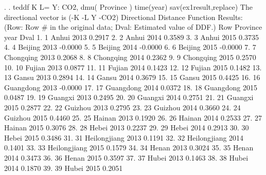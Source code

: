 . 
. teddf K L= Y: CO2, dmu( Province ) time(year) sav(ex1result,replace)
{\smallskip}
The directional vector is (-K -L Y -CO2)
{\smallskip}
{\smallskip}
Directional Distance Function Results:
(Row: Row \# in the original data; Dval: Estimated value of DDF.)
{\smallskip}
{\TLC}
{\VBAR} Row         Province   year      Dval {\VBAR}
{\LFTT}
1. {\VBAR}   1            Anhui   2013    0.2917 {\VBAR}
2. {\VBAR}   2            Anhui   2014    0.3589 {\VBAR}
3. {\VBAR}   3            Anhui   2015    0.3735 {\VBAR}
4. {\VBAR}   4          Beijing   2013   -0.0000 {\VBAR}
5. {\VBAR}   5          Beijing   2014   -0.0000 {\VBAR}
6. {\VBAR}   6          Beijing   2015   -0.0000 {\VBAR}
7. {\VBAR}   7        Chongqing   2013    0.2068 {\VBAR}
8. {\VBAR}   8        Chongqing   2014    0.2362 {\VBAR}
9. {\VBAR}   9        Chongqing   2015    0.2570 {\VBAR}
10. {\VBAR}  10           Fujian   2013    0.0877 {\VBAR}
11. {\VBAR}  11           Fujian   2014    0.1423 {\VBAR}
12. {\VBAR}  12           Fujian   2015    0.1482 {\VBAR}
13. {\VBAR}  13            Gansu   2013    0.2894 {\VBAR}
14. {\VBAR}  14            Gansu   2014    0.3679 {\VBAR}
15. {\VBAR}  15            Gansu   2015    0.4425 {\VBAR}
16. {\VBAR}  16        Guangdong   2013   -0.0000 {\VBAR}
17. {\VBAR}  17        Guangdong   2014    0.0372 {\VBAR}
18. {\VBAR}  18        Guangdong   2015    0.0487 {\VBAR}
19. {\VBAR}  19          Guangxi   2013    0.2495 {\VBAR}
20. {\VBAR}  20          Guangxi   2014    0.2751 {\VBAR}
21. {\VBAR}  21          Guangxi   2015    0.2877 {\VBAR}
22. {\VBAR}  22          Guizhou   2013    0.2795 {\VBAR}
23. {\VBAR}  23          Guizhou   2014    0.3660 {\VBAR}
24. {\VBAR}  24          Guizhou   2015    0.4460 {\VBAR}
25. {\VBAR}  25           Hainan   2013    0.1920 {\VBAR}
26. {\VBAR}  26           Hainan   2014    0.2533 {\VBAR}
27. {\VBAR}  27           Hainan   2015    0.3076 {\VBAR}
28. {\VBAR}  28            Hebei   2013    0.2237 {\VBAR}
29. {\VBAR}  29            Hebei   2014    0.2913 {\VBAR}
30. {\VBAR}  30            Hebei   2015    0.3486 {\VBAR}
31. {\VBAR}  31     Heilongjiang   2013    0.1191 {\VBAR}
32. {\VBAR}  32     Heilongjiang   2014    0.1401 {\VBAR}
33. {\VBAR}  33     Heilongjiang   2015    0.1579 {\VBAR}
34. {\VBAR}  34            Henan   2013    0.3024 {\VBAR}
35. {\VBAR}  35            Henan   2014    0.3473 {\VBAR}
36. {\VBAR}  36            Henan   2015    0.3597 {\VBAR}
37. {\VBAR}  37            Hubei   2013    0.1463 {\VBAR}
38. {\VBAR}  38            Hubei   2014    0.1870 {\VBAR}
39. {\VBAR}  39            Hubei   2015    0.2051 {\VBAR}
